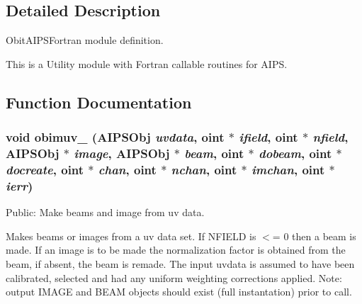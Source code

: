 

\subsection{Detailed Description}
Obit\-AIPSFortran module definition. 

This is a Utility module with Fortran callable routines for AIPS.

\subsection{Function Documentation}
\subsubsection{\setlength{\rightskip}{0pt plus 5cm}void obimuv\_\- ({\bf AIPSObj} {\em uvdata}, {\bf oint} $\ast$ {\em ifield}, {\bf oint} $\ast$ {\em nfield}, {\bf AIPSObj} $\ast$ {\em image}, {\bf AIPSObj} $\ast$ {\em beam}, {\bf oint} $\ast$ {\em dobeam}, {\bf oint} $\ast$ {\em docreate}, {\bf oint} $\ast$ {\em chan}, {\bf oint} $\ast$ {\em nchan}, {\bf oint} $\ast$ {\em imchan}, {\bf oint} $\ast$ {\em ierr})}\label{ObitAIPSFortran_8h_a4}


Public: Make beams and image from uv data. 

Makes beams or images from a uv data set. If NFIELD is $<$= 0 then a beam is made. If an image is to be made the normalization factor is obtained from the beam, if absent, the beam is remade. The input uvdata is assumed to have been calibrated, selected and had any uniform weighting corrections applied. Note: output IMAGE and BEAM objects should exist (full instantation) prior to call.


